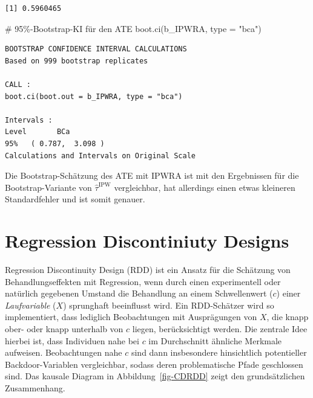 \documentclass[
  a4paper,
  DIV=11,
  oneside]{scrreprt}
\newenvironment{Shaded}{\begin{snugshade}}{\end{snugshade}}
\newcommand{\AttributeTok}[1]{\textcolor[rgb]{0.40,0.45,0.13}{#1}}
\newcommand{\CommentTok}[1]{\textcolor[rgb]{0.37,0.37,0.37}{#1}}
\newcommand{\FunctionTok}[1]{\textcolor[rgb]{0.28,0.35,0.67}{#1}}
\newcommand{\NormalTok}[1]{\textcolor[rgb]{0.00,0.23,0.31}{#1}}
\newcommand{\StringTok}[1]{\textcolor[rgb]{0.13,0.47,0.30}{#1}}
\begin{document}
\begin{verbatim}
[1] 0.5960465
\end{verbatim}

\begin{Shaded}
\begin{Highlighting}[]
\CommentTok{\# 95\%{-}Bootstrap{-}KI für den ATE}
\FunctionTok{boot.ci}\NormalTok{(b\_IPWRA, }\AttributeTok{type =} \StringTok{"bca"}\NormalTok{)}
\end{Highlighting}
\end{Shaded}

\begin{verbatim}
BOOTSTRAP CONFIDENCE INTERVAL CALCULATIONS
Based on 999 bootstrap replicates

CALL : 
boot.ci(boot.out = b_IPWRA, type = "bca")

Intervals : 
Level       BCa          
95%   ( 0.787,  3.098 )  
Calculations and Intervals on Original Scale
\end{verbatim}

Die Bootstrap-Schätzung des ATE mit IPWRA ist mit den Ergebnissen für
die Bootstrap-Variante von \(\widehat{\tau}^\text{IPW}\) vergleichbar,
hat allerdings einen etwas kleineren Standardfehler und ist somit
genauer.


\chapter{Regression Discontiniuty
Designs}\label{regression-discontiniuty-designs}

Regression Discontinuity Design (RDD) ist ein Ansatz für die Schätzung
von Behandlungseffekten mit Regression, wenn durch einen experimentell
oder natürlich gegebenen Umstand die Behandlung an einem Schwellenwert
(\(c\)) einer \emph{Laufvariable} (\(X\)) sprunghaft beeinflusst wird.
Ein RDD-Schätzer wird so implementiert, dass lediglich Beobachtungen mit
Ausprägungen von \(X\), die knapp ober- oder knapp unterhalb von \(c\)
liegen, berücksichtigt werden. Die zentrale Idee hierbei ist, dass
Individuen nahe bei \(c\) im Durchschnitt ähnliche Merkmale aufweisen.
Beobachtungen nahe \(c\) sind dann insbesondere hinsichtlich
potentieller Backdoor-Variablen vergleichbar, sodass deren
problematische Pfade geschlossen sind. Das kausale Diagram in
Abbildung~\ref{fig-CDRDD} zeigt den grundsätzlichen Zusammenhang.
\end{document}
